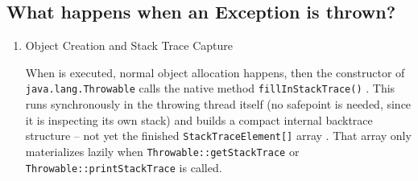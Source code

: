 \subsection{What happens when an Exception is thrown?}
\begin{enumerate}
	\item{Object Creation and Stack Trace Capture
	 
	When  is executed, normal object allocation happens, then the constructor of \lstinline|java.lang.Throwable| \autocite{ORACLE_DOC_THROWABLE_CLASS} calls the native method \lstinline|fillInStackTrace()| \autocite{ORACLE_DOC_THROWABLE:fillInStackTrace}. This runs synchronously in the throwing thread itself (no safepoint is needed, since it is inspecting its own stack) and builds a compact internal backtrace structure – not yet the finished \lstinline|StackTraceElement[]| array \autocite{ORACLE_DOC_STACKTRACEELEMENT_CLASS}. That array only materializes lazily when \lstinline|Throwable::getStackTrace| \autocite{ORACLE_DOC_THROWABLE:getStackTrace} or \lstinline|Throwable::printStackTrace| \autocite{ORACLE_DOC_THROWABLE:printStackTrace} is called.
	
}
\end{enumerate}
